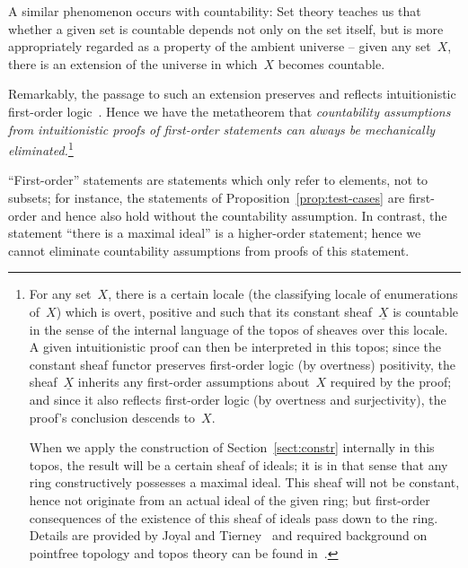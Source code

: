 \documentclass[envcountsect,envcountsame,runningheads]{llncs}
\renewcommand{\_}{\mathpunct{.}\,}
\begin{document}
A similar phenomenon occurs with countability: Set theory teaches us that
whether a given set is countable depends not only on the set itself, but is
more appropriately regarded as a property of the ambient universe -- given any
set~$X$, there is an extension of the universe in which~$X$ becomes countable.

Remarkably, the passage to such an extension preserves and reflects
intuitionistic first-order logic~\cite[pp.~36f.]{joyal-tierney:grothendieck}.
Hence we have the metatheorem that \emph{countability assumptions from
intuitionistic proofs of first-order statements can always be mechanically
eliminated.}\footnote{For any set~$X$, there is a certain locale (the
classifying locale of enumerations of~$X$) which is overt, positive and such
that its constant sheaf~$\underline{X}$ is countable in the sense of the
internal language of the topos of sheaves over this locale. A given
intuitionistic proof can then be interpreted in this topos; since the constant
sheaf functor preserves first-order logic (by overtness) positivity, the
sheaf~$\underline{X}$ inherits any first-order assumptions about~$X$ required
by the proof; and since it also reflects first-order logic (by overtness and
surjectivity), the proof's conclusion descends to~$X$.\par When we apply the
construction of Section~\ref{sect:constr} internally in this topos, the result
will be a certain sheaf of ideals; it is in that sense that any ring
constructively possesses a maximal ideal. This sheaf will not be constant,
hence not originate from an actual ideal of the given ring; but first-order
consequences of the existence of this sheaf of ideals pass down to the ring.
Details are provided by Joyal and
Tierney~\cite[pp.~36f.]{joyal-tierney:grothendieck} and required background on
pointfree topology and topos theory can be found
in~\cite{blechschmidt:generalized-spaces,johnstone:art,johnstone:point,vickers:continuity,vickers:locales-toposes,belanger-marquis:pointless,johnstone:baby-elephant}.}

``First-order'' statements are statements which only refer to elements, not to
subsets; for instance, the statements of Proposition~\ref{prop:test-cases} are
first-order and hence also hold without the countability assumption.
In contrast, the statement ``there is a maximal ideal'' is a higher-order
statement; hence we cannot eliminate countability assumptions from proofs of
this statement.
\end{document}
